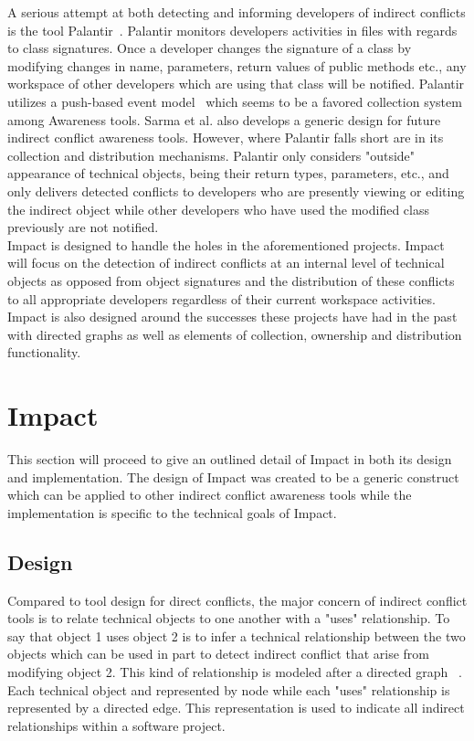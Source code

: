 \documentclass[conference]{IEEEtran}
\begin{document}
A serious attempt at both detecting and informing developers of
indirect conflicts is the tool Palantir~\cite{Sarma:2007:TSA}. Palantir
monitors developers activities in files with regards to class signatures.
Once a developer changes the signature of a class by modifying changes
in name, parameters, return values of public methods etc., any workspace
of other developers which are using that class will be notified. Palantir utilizes
a push-based event model~\cite{Fitzpatrick:2002:SPA} which seems to be
a favored collection system among Awareness tools. Sarma et al. also
develops a generic design for future indirect conflict awareness tools. 
However, where Palantir falls short are in its collection and distribution
mechanisms. Palantir only considers "outside" appearance of technical
objects, being their return types, parameters, etc., and only delivers
detected conflicts to developers who are presently viewing or editing
the indirect object while other developers who have used the modified 
class previously are not notified.\\

Impact is designed to handle the holes in the aforementioned projects.
Impact will focus on the detection of indirect conflicts at an internal level
of technical objects as opposed from object signatures and the distribution
of these conflicts to all appropriate developers regardless of their current
workspace activities. Impact is also designed around the successes these
projects have had in the past with directed graphs as 
well as elements of collection, ownership and distribution functionality.\\


\section{Impact}
This section will proceed to give an outlined detail of Impact in both its
design and implementation. The design of Impact was created to be
a generic construct which can be applied to other indirect conflict 
awareness tools while the implementation is specific to the technical
goals of Impact.

\subsection{Design}
Compared to tool design for direct conflicts, the major concern of 
indirect conflict tools is to relate technical objects to one another
with a "uses" relationship. To say that object 1 uses object 2 is to infer
a technical relationship between the two objects which can be used
in part to detect indirect conflict that arise from modifying object
2. This kind of relationship is modeled after a directed graph ~\cite{Horwitz:1992:UPD}. 
Each technical object and represented by node while each "uses"
relationship is represented by a directed edge. This representation
is used to indicate all indirect relationships within a software project.\\
\end{document}
